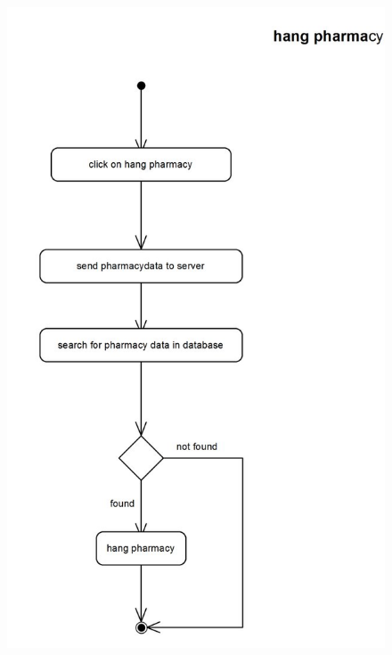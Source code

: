 \documentclass[]{article}
\begin{document}
\begin{figure}[H]
\centering
\includegraphics[scale=0.6]{./activity/23}
\end{figure}
\end{document}
